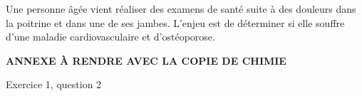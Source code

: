 \newpage
\vAligne{-80pt}


Une personne âgée vient réaliser des examens de santé suite à des douleurs dans la poitrine et dans une de ses jambes.
L'enjeu est de déterminer si elle souffre d'une maladie cardiovasculaire et d'ostéoporose.

\bigskip



\newpage



\vspace*{36pt}
\begin{boite}
  \centering
  \textbf{ANNEXE À RENDRE AVEC LA COPIE DE CHIMIE}
\end{boite}

Exercice 1, question 2

\begin{center}
\end{center}